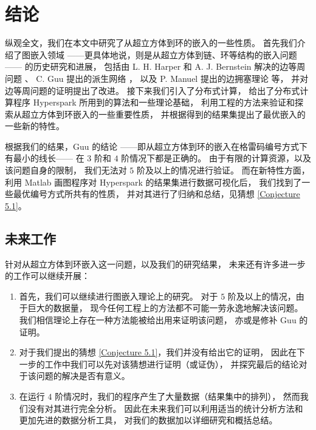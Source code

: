 
\chapter{结论}
\label{Chapter 6}

纵观全文，我们在本文中研究了从超立方体到环的嵌入的一些性质。
首先我们介绍了图嵌入领域
——更具体地说，则是从超立方体到链、环等结构的嵌入问题——
的历史研究和进展，
包括由 L. H. Harper 和 A. J. Bernstein 解决的边等周问题 \cite{Harper.1964,Bernstein.1967}、
C. Guu 提出的派生网络 \cite{Guu.1997}，
以及 P. Manuel 提出的边拥塞理论 \cite{Manuel.2009} 等，
并对边等周问题的证明提出了改进。
接下来我们引入了分布式计算，
给出了分布式计算程序 Hyperspark 所用到的算法和一些理论基础，
利用工程的方法来验证和探索从超立方体到环嵌入的一些重要性质，
并根据得到的结果集提出了最优嵌入的一些新的特性。

根据我们的结果，Guu 的结论
——即从超立方体到环的嵌入在格雷码编号方式下有最小的线长——
在 $3$ 阶和 $4$ 阶情况下都是正确的。
由于有限的计算资源，以及该问题自身的限制，
我们无法对 $5$ 阶及以上的情况进行验证。
而在新特性方面，利用 Matlab 画图程序对 Hyperspark 的结果集进行数据可视化后，
我们找到了一些最优编号方式所共有的性质，
并对其进行了归纳和总结，见猜想 \ref{Conjecture 5.1}。

\section{未来工作}
\label{Section 6.1}

针对从超立方体到环嵌入这一问题，以及我们的研究结果，
未来还有许多进一步的工作可以继续开展：
\begin{enumerate}[(1)]
	\item 首先，我们可以继续进行图嵌入理论上的研究。
		对于 $5$ 阶及以上的情况，由于巨大的数据量，
		现今任何工程上的方法都不可能一劳永逸地解决该问题。
		我们相信理论上存在一种方法能被给出用来证明该问题，
		亦或是修补 Guu 的证明。
	\item 对于我们提出的猜想 \ref{Conjecture 5.1}，我们并没有给出它的证明，
		因此在下一步的工作中我们可以先对该猜想进行证明（或证伪），
		并探究最后的结论对于该问题的解决是否有意义。
	\item 在运行 $4$ 阶情况时，我们的程序产生了大量数据（结果集中的排列），
		然而我们没有对其进行完全分析。
		因此在未来我们可以利用适当的统计分析方法和更加先进的数据分析工具，
		对我们的数据加以详细研究和概括总结。
\end{enumerate}
